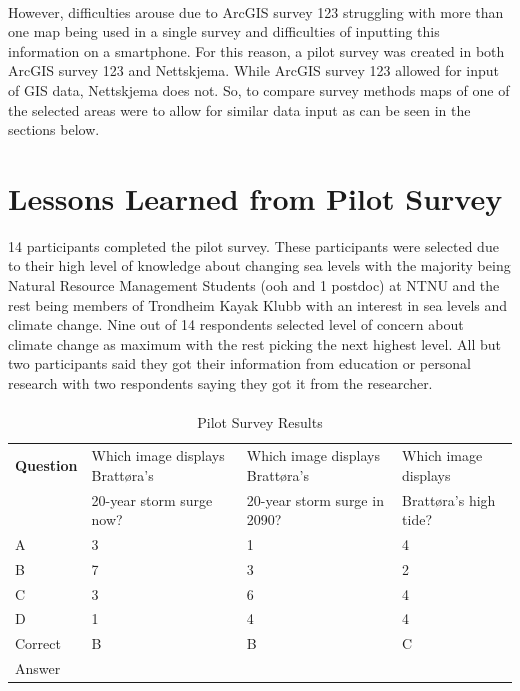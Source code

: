 \paragraph{}
However, difficulties arouse due to ArcGIS survey 123 struggling with more than one map being used in a single survey and difficulties of inputting this information on a smartphone. For this reason, a pilot survey was created in both ArcGIS survey 123 and Nettskjema. While ArcGIS survey 123 allowed for input of GIS data, Nettskjema does not. So, to compare survey methods maps of one of the selected areas were to allow for similar data input as can be seen in the sections below. 

\section{Lessons Learned from Pilot Survey}
14 participants completed the pilot survey. These participants were selected due to their high level of knowledge about changing sea levels with the majority being Natural Resource Management Students (ooh and 1 postdoc) at NTNU and the rest being members of Trondheim Kayak Klubb with an interest in sea levels and climate change. Nine out of 14 respondents selected level of concern about climate change as maximum with the rest picking the next highest level. All but two participants said they got their information from education or personal research with two respondents saying they got it from the researcher. 
\paragraph{}
\begin{table}[h]
    \centering
    \begin{tabular}{|l|l|l|l|}
    \hline
        \textbf{Question} & Which image displays Brattøra's  & Which image displays Brattøra's & Which image displays   \\ \newline
         & 20-year storm surge now? &  20-year storm surge in 2090? & Brattøra's high tide? \\ \hline
        A & 3 & 1 & 4 \\ \hline
        B & 7 & 3 & 2 \\ \hline
        C & 3 & 6 & 4 \\ \hline
        D & 1 & 4 & 4 \\ \hline
        Correct & B & B & C \\ \newline
        Answer &  &  &  \\ \hline
    \end{tabular}
    \caption{Pilot Survey Results}
    \label{table: pilot-survey}
\end{table}
